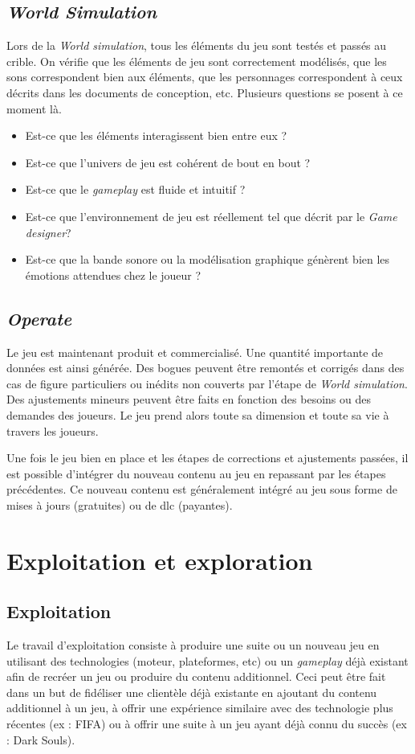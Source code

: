 \subsection{\emph{World Simulation}}
Lors de la \emph{World simulation}, tous les éléments du jeu sont testés et passés au crible. On vérifie que les éléments de jeu sont correctement modélisés, que les sons correspondent bien aux éléments, que les personnages correspondent à ceux décrits dans les documents de conception, etc. Plusieurs questions se posent à ce moment là. 
\begin{itemize}
    \item Est-ce que les éléments interagissent bien entre eux ?
    \item Est-ce que l'univers de jeu est cohérent de bout en bout ?
    \item Est-ce que le \emph{gameplay} est fluide et intuitif ?
    \item Est-ce que l'environnement de jeu est réellement tel que décrit par le \emph{Game designer}?
    \item Est-ce que la bande sonore ou la modélisation graphique génèrent bien les émotions attendues chez le joueur ?
\end{itemize}


\subsection{\emph{Operate}}
Le jeu est maintenant produit et commercialisé. Une quantité importante de données est ainsi générée. Des bogues peuvent être remontés et corrigés dans des cas de figure particuliers ou inédits non couverts par l'étape de \emph{World simulation}. Des ajustements mineurs peuvent être faits en fonction des besoins ou des demandes des joueurs. Le jeu prend alors toute sa dimension et toute sa vie à travers les joueurs.

Une fois le jeu bien en place et les étapes de corrections et ajustements passées, il est possible d'intégrer du nouveau contenu au jeu en repassant par les étapes précédentes. Ce nouveau contenu est généralement intégré au jeu sous forme de mises à jours (gratuites) ou de \gls{dlc} (payantes).



\section{Exploitation et exploration}
\subsection{Exploitation}
Le travail d'exploitation consiste à produire une suite ou un nouveau jeu en utilisant des technologies (moteur, plateformes, etc) ou un \emph{gameplay} déjà existant afin de recréer un jeu ou produire du contenu additionnel. Ceci peut être fait dans un but de fidéliser une clientèle déjà existante en ajoutant du contenu additionnel à un jeu, à offrir une expérience similaire avec des technologie plus récentes (ex : FIFA) ou à offrir une suite à un jeu ayant déjà connu du succès (ex : Dark Souls).

